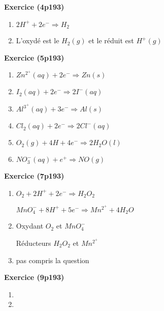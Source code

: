 \documentclass[12pt,a4paper]{article}
\begin{document}
\begin{center}
        \shadowbox{\begin{large}
                \textcolor{black}{Exercices }
        \end{large}}
    \end{center}
    \vspace{0.5 cm}
\textbf{Exercice (4p193)}
\begin{enumerate}\par
			\item $2H^++2e^-$$\Rightarrow$$H_2$
			\item L'oxydé est le $H_2(g)$ et le réduit est $H^+(g)$
\end{enumerate}

\textbf{Exercice (5p193)}
\begin{enumerate}\par
			\item $Zn^2^+(aq)+2e^-$$\Rightarrow$$Zn(s)$
			\item $I_2(aq)+2e^-$$\Rightarrow$$2I^-(aq)$
			\item $Al^3^+(aq)+3e^-$$\Rightarrow$$Al(s)$
			\item $Cl_2(aq)+2e^-$$\Rightarrow$$2Cl^-(aq)$
			\item $O_2(g)+4H + 4e^-$$\Rightarrow$$2H_2O(l)$
			\item $NO_3^-(aq)+e^+$$\Rightarrow$$NO(g)$
\end{enumerate}

\textbf{Exercice (7p193)}
\begin{enumerate}\par
			\item $O_2 + 2H^+ + 2e^-$$\Rightarrow$$H_2O_2$\par
				  $MnO_4^- + 8H^+ + 5e^-$$\Rightarrow$$Mn^2^+ + 4H_2O$
			\item Oxydant $O_2$ et $MnO_4^- $\par
				  Réducteurs $H_2O_2$ et $Mn^2^+ $  
			\item pas compris la question
\end{enumerate}

\textbf{Exercice (9p193)}
\begin{enumerate}\par
			\item
			\item
\end{enumerate}
\end{document}

